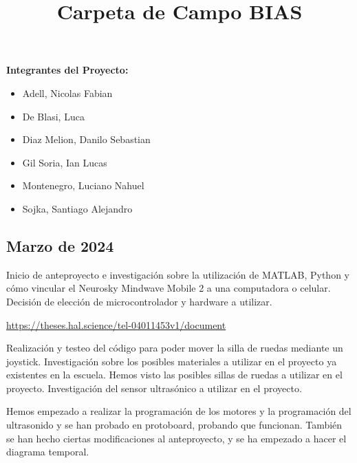 \documentclass{article}
\title{Carpeta de Campo BIAS}
\date{}
\begin{document}
\maketitle

\vspace{1cm} 

\textbf{Integrantes del Proyecto:} 

\begin{itemize}
    \item Adell, Nicolas Fabian
    \item De Blasi, Luca
    \item Diaz Melion, Danilo Sebastian
    \item Gil Soria, Ian Lucas
    \item Montenegro, Luciano Nahuel
    \item Sojka, Santiago Alejandro
\end{itemize}

\newpage







\begin{center}
    \section{Marzo de 2024}
\end{center}

Inicio de anteproyecto e investigación sobre la utilización de MATLAB, Python y cómo vincular el Neurosky Mindwave Mobile 2 a una computadora o celular. Decisión de elección de microcontrolador y hardware a utilizar.

\begin{center}
    \href{https://theses.hal.science/tel-04011453v1/document}{https://theses.hal.science/tel-04011453v1/document}
\end{center}

Realización y testeo del código para poder mover la silla de ruedas mediante un joystick.
Investigación sobre los posibles materiales a utilizar en el proyecto ya existentes en la escuela. Hemos visto las posibles sillas de ruedas a utilizar en el proyecto.
Investigación del sensor ultrasónico a utilizar en el proyecto.

Hemos empezado a realizar la programación de los motores y la programación del ultrasonido y se han probado en protoboard, probando que funcionan. También se han hecho ciertas modificaciones al anteproyecto, y se ha empezado a hacer el diagrama temporal. 
\end{document}
